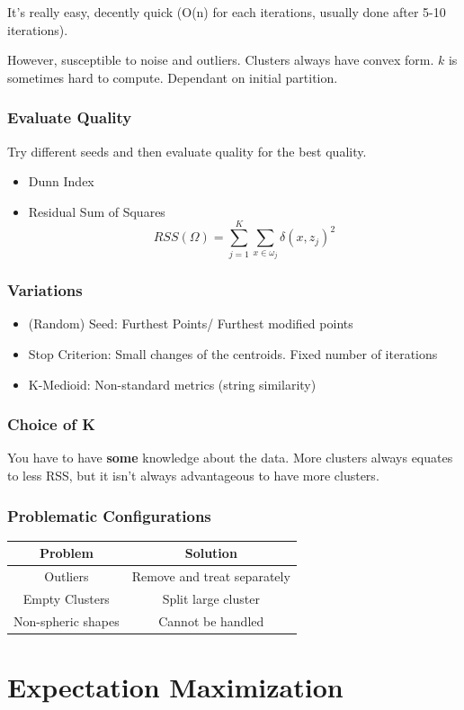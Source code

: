 \documentclass{article}
\begin{document}
It's really easy, decently quick (O(n) for each iterations, usually done after 5-10 iterations).

However, susceptible to noise and outliers. Clusters always have convex form. $k$ is sometimes hard to compute. Dependant on initial partition.


\subsubsection{Evaluate Quality}
Try different seeds and then evaluate quality for the best quality.

\begin{itemize}
  \item Dunn Index
  \item Residual Sum of Squares
  \[RSS(\Omega) = \sum_{j=1}^{K}\sum_{x\in\omega_j} \delta(x,z_j)^2\]
\end{itemize}

\subsubsection{Variations}
\begin{itemize}
  \item (Random) Seed: Furthest Points/ Furthest modified points
  \item Stop Criterion: Small changes of the centroids. Fixed number of iterations
  \item K-Medioid: Non-standard metrics (string similarity)
\end{itemize}

\subsubsection{Choice of K}
You have to have \textbf{some} knowledge about the data. More clusters always equates to less RSS, but it isn't always advantageous to have more clusters.

\subsubsection{Problematic Configurations}
\begin{center}
  \begin{tabular}{|c|c|}
    \hline
    Problem & Solution \\
    \hline
    Outliers & Remove and treat separately\\
    \hline
    Empty Clusters & Split large cluster\\
    \hline
    Non-spheric shapes & Cannot be handled \\
    \hline
  \end{tabular}
\end{center}\section{Expectation Maximization}
\end{document}
